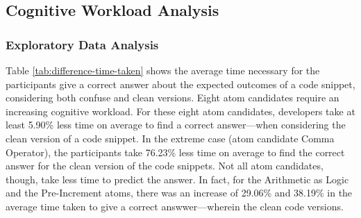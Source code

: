 
\subsection{Cognitive Workload Analysis}

\subsubsection*{Exploratory Data Analysis}
Table \ref{tab:difference-time-taken} shows the average time necessary for the participants give a correct answer about the expected outcomes of a code snippet, considering both confuse and clean versions. Eight atom candidates require an increasing cognitive workload. For these eight atom candidates, developers take at least 5.90\% less time on average to find a correct answer---when considering the clean version of a code snippet. In the extreme case (atom candidate Comma Operator), the participants take 76.23\% less
time on average to find the correct answer for the clean version of the code snippets. 
Not all atom candidates, though, take less time to predict the answer. In fact, for the Arithmetic as Logic and the Pre-Increment atoms, there was an increase
of 29.06\% and 38.19\% in the average time taken to give a correct answwer---wherein the clean code versions.

